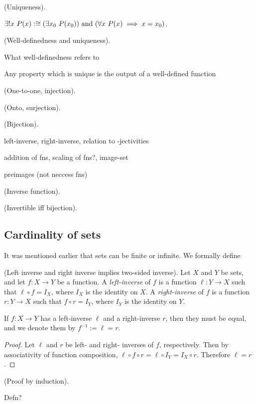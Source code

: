 \begin{defn}
    (Uniqueness).
    
    $\exists !x \text{ } P(x) :\cong (\exists x_0 \text{ } P(x_0)) \text{ and } (\forall x \text{ } P(x) \implies x = x_0)$.
\end{defn}

\begin{remark}
    (Well-definedness and uniqueness).
    
    What well-definedness refers to
    
    Any property which is unique is the output of a well-defined function
\end{remark}

\begin{defn}
    (One-to-one, injection).
\end{defn}

\begin{defn}
    (Onto, surjection).
\end{defn}

\begin{defn}
    (Bijection).
\end{defn}

left-inverse, right-inverse, relation to -jectivities

addition of fns, scaling of fns?, image-set

preimages (not neccess fns)

\begin{defn}
\label{ch::logic_pf_fns::defn::inverse_fn}

    (Inverse function).
\end{defn}

\begin{theorem}
\label{ch::logic_pf_fns::thm::invertible_iff_bijection}
    (Invertible iff bijection).
\end{theorem}

\subsection*{Cardinality of sets}

It was mentioned earlier that sets can be finite or infinite. We formally define

\begin{theorem}
    (Left inverse and right inverse implies two-sided inverse). Let $X$ and $Y$ be sets, and let $f:X \rightarrow Y$ be a function. A \textit{left-inverse} of $f$ is a function $\ell:Y \rightarrow X$ such that $\ell \circ f = I_X$, where $I_X$ is the identity on $X$. A \textit{right-inverse} of $f$ is a function $r:Y \rightarrow X$ such that $f \circ r = I_Y$, where $I_Y$ is the identity on $Y$.
    
    If $f:X \rightarrow Y$ has a left-inverse $\ell$ and a right-inverse $r$, then they must be equal, and we denote them by $f^{-1} := \ell = r$.
\end{theorem}

\begin{proof}
    Let $\ell$ and $r$ be left- and right- inverses of $f$, respectively. Then by associativity of function composition, $\ell \circ f \circ r = \ell \circ I_Y = I_X \circ r$. Therefore $\ell = r$.
\end{proof}

\begin{defn}
    (Proof by induction).
    
    Defn?
\end{defn}
